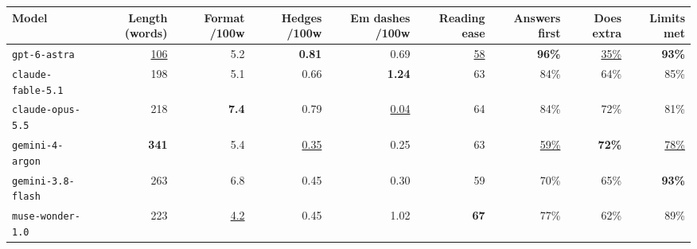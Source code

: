 \begin{tabular}{lrrrrrrrr}
\toprule
Model & Length (words) & Format /100w & Hedges /100w & Em dashes /100w & Reading ease & Answers first & Does extra & Limits met \\
\midrule
\texttt{gpt-6-astra} & \underline{106} & 5.2 & \textbf{0.81} & 0.69 & \underline{58} & \textbf{96\%} & \underline{35\%} & \textbf{93\%} \\
\texttt{claude-fable-5.1} & 198 & 5.1 & 0.66 & \textbf{1.24} & 63 & 84\% & 64\% & 85\% \\
\texttt{claude-opus-5.5} & 218 & \textbf{7.4} & 0.79 & \underline{0.04} & 64 & 84\% & 72\% & 81\% \\
\texttt{gemini-4-argon} & \textbf{341} & 5.4 & \underline{0.35} & 0.25 & 63 & \underline{59\%} & \textbf{72\%} & \underline{78\%} \\
\texttt{gemini-3.8-flash} & 263 & 6.8 & 0.45 & 0.30 & 59 & 70\% & 65\% & \textbf{93\%} \\
\texttt{muse-wonder-1.0} & 223 & \underline{4.2} & 0.45 & 1.02 & \textbf{67} & 77\% & 62\% & 89\% \\
\bottomrule
\end{tabular}

